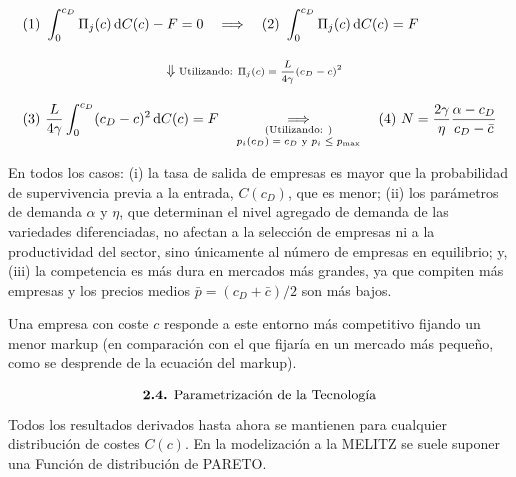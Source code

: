 \documentclass[10pt,a4paper]{article}
\begin{document}
$$\begin{aligned}
    &\text(1)\,\,\int_0^{c_D} \Pi_j(c)\, \mathrm dC(c) - F=0\quad\Longrightarrow\quad\text{(2)}\,\, \int_0^{c_D} \Pi_j(c)\, \mathrm dC(c) = F\\[1em]
    &\hspace{10em}\Downarrow \text{\scriptsize Utilizando: $\Pi_j(c)=\frac{L}{4\gamma}(c_D-c)^2$}\\[1em]
    &\text{(3)}\,\,\frac{L}{4\gamma}\int_0^{c_D}(c_D-c)^2\, \mathrm dC(c) = F\quad\underset{\substack{\text{\scriptsize (Utilizando: )}\\\text{\scriptsize $p_i(c_D)=c_D$ y $p_i\leq p_{\max}$}}}{\Longrightarrow}\quad\text{(4)}\,\,N=\frac{2\gamma}{\eta}\frac{\alpha-c_D}{c_D-\bar c}
\end{aligned}$$

En todos los casos: (i) la tasa de salida de empresas es mayor que la probabilidad de supervivencia previa a la entrada, $C(c_D)$, que es menor; (ii) los parámetros de demanda $\alpha$ y $\eta$, que determinan el nivel agregado de demanda de las variedades diferenciadas, no afectan a la selección de empresas ni a la productividad del sector, sino únicamente al número de empresas en equilibrio; y, (iii) la competencia es más dura en mercados más grandes, ya que compiten más empresas y los precios medios $\bar{p} = (c_D + \bar{c})/2$ son más bajos. 

Una empresa con coste $c$ responde a este entorno más competitivo fijando un menor markup (en comparación con el que fijaría en un mercado más pequeño, como se desprende de la ecuación del markup).

$$\text{\textbf{2.4.} Parametrización de la Tecnología}$$
Todos los resultados derivados hasta ahora se mantienen para cualquier distribución de costes $C(c)$. En la modelización a la MELITZ se suele suponer una Función de distribución de PARETO. 
\end{document}
